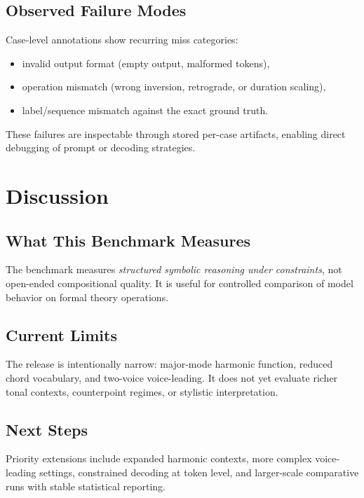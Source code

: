 \documentclass{article}
\begin{document}
\subsection{Observed Failure Modes}

Case-level annotations show recurring miss categories:
\begin{itemize}
    \item invalid output format (empty output, malformed tokens),
    \item operation mismatch (wrong inversion, retrograde, or duration scaling),
    \item label/sequence mismatch against the exact ground truth.
\end{itemize}

These failures are inspectable through stored per-case artifacts, enabling direct debugging of prompt or decoding strategies.

\section{Discussion}
\label{sec:discussion}

\subsection{What This Benchmark Measures}

The benchmark measures \emph{structured symbolic reasoning under constraints}, not open-ended compositional quality. It is useful for controlled comparison of model behavior on formal theory operations.

\subsection{Current Limits}

The release is intentionally narrow: major-mode harmonic function, reduced chord vocabulary, and two-voice voice-leading. It does not yet evaluate richer tonal contexts, counterpoint regimes, or stylistic interpretation.

\subsection{Next Steps}

Priority extensions include expanded harmonic contexts, more complex voice-leading settings, constrained decoding at token level, and larger-scale comparative runs with stable statistical reporting.
\end{document}
